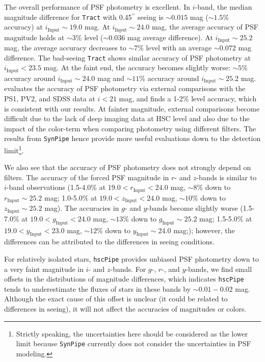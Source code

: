 \documentclass[useamsfonts]{pasj01}
\def\asec{$^{\prime\prime}$}
\def\hscpipe{\texttt{hscPipe}}
\def\synpipe{\texttt{SynPipe}}
\def\tract{\texttt{Tract}}
\begin{document}
    The overall performance of PSF photometry is excellent.
    In $i$-band, the median magnitude difference for \tract{} with 0.45\asec{} seeing is
     ${\sim}0.015$ mag (${\sim}1.5$\% accuracy) at
    $i_{\mathrm{Input}}{\sim}19.0$ mag.
    At $i_{\mathrm{Input}}{\sim}24.0$ mag, the average accuracy of PSF
    magnitude holds at ${\sim}3$\% level (${\sim}0.036$ mag average difference).
    At $i_{\mathrm{Input}}{\sim}25.2$ mag, the average accuracy decreases to
    ${\sim}7$\% level with an average ${\sim}0.072$ mag difference.
    The bad-seeing \tract{} shows similar accuracy of PSF photometry at
    $i_{\mathrm{Input}}<23.5$ mag.
    At the faint end, the accuracy becomes slightly worse: ${\sim}5$\% accuracy around
    $i_{\mathrm{Input}}{\sim}24.0$ mag and ${\sim}11$\% accuracy around
    $i_{\mathrm{Input}}{\sim}25.2$ mag.
    \citet{HSCDR1} evaluates the accuracy of PSF photometry via external comparisons
    with the PS1, PV2, and SDSS data at $i<21$ mag, and finds a 1-2\% level accuracy,
    which is consistent with our results.
    At fainter magnitude, external comparisons become difficult due to the lack of deep
    imaging data at HSC level and also due to the impact of the color-term when comparing photometry
    using different filters.
    The results from \synpipe{} hence provide more useful evaluations down to the
    detection limit\footnote{Strictly speaking, the uncertainties here should be
    considered as the lower limit because \synpipe{} currently does not consider the uncertainties
    in PSF modeling.}.

    We also see that the accuracy of PSF photometry does not strongly depend on filters.
    The accuracy of the forced PSF magnitude in $r$- and $z$-bands is similar to
    $i$-band observations (1.5-4.0\% at $19.0 < r_{\mathrm{Input}} < 24.0$ mag, ${\sim}8$\% down to
    $r_{\mathrm{Input}}{\sim}25.2$ mag;
    1.0-5.0\% at $19.0 < z_{\mathrm{Input}} < 24.0$ mag, ${\sim}10$\% down to
    $z_{\mathrm{Input}}{\sim}25.2$ mag).
    The accuracies in $g$- and $y$-bands become slightly worse (1.5-7.0\% at $19.0 < g_{\mathrm{Input}} < 24.0$ mag, ${\sim}13$\% down to
    $g_{\mathrm{Input}}{\sim}25.2$ mag;
    1.5-5.0\% at $19.0 < y_{\mathrm{Input}} < 23.0$ mag, ${\sim}12$\% down to
    $y_{\mathrm{Input}}{\sim}24.0$ mag;); however, the differences can be attributed to the
    differences in seeing conditions.

    For relatively isolated stars, \hscpipe{} provides unbiased PSF photometry down to a
    very faint magnitude in $i$- and $z$-bands.
    For $g$-, $r$-, and $y$-bands, we find small offsets in the distributions of magnitude
    differences, which indicates \hscpipe{} tends to underestimate the fluxes of stars
    in these bands by ${\sim}0.01-0.02$ mag.
    Although the exact cause of this offset is unclear (it could be related to
    differences in seeing), it will not affect the accuracies of magnitudes or colors.
\end{document}
